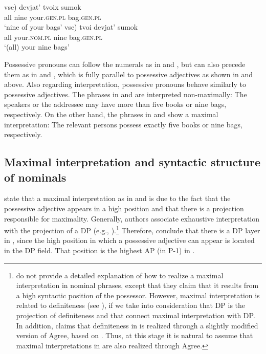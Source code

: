 \documentclass[output=paper,
colorlinks,
citecolor=brown,
newtxmath
]{langscibook}
\begin{document}
\ea\label{Num-Possprn2}
\ea\label{NumPossprn2}
\gll \minsp{(*} vse) devjat' tvoix sumok\\
{} all nine your.\textsc{gen.pl} bag.\textsc{gen.pl}\\
\glt `nine of your bags'
\ex\label{PossprnNum2}
\gll \minsp{(} vse) tvoi devjat' sumok\\
{} all your.\textsc{nom.pl} nine bag.\textsc{gen.pl}\\
\glt `(all) your nine bags'
\z\z

    \largerpage[-1] %

\noindent Possessive pronouns can follow the numerals as in  and , but can also precede them as in  and , which is fully parallel to possessive adjectives as shown in  and  above. Also regarding interpretation, possessive pronouns behave similarly to possessive adjectives. The phrases in  and  are interpreted non-maximally: The speakers or the addressee may have more than five books or nine bags, respectively. On the other hand, the phrases in  and  show a maximal interpretation: The relevant persons possess exactly five books or nine bags, respectively.

\subsection{Maximal interpretation and syntactic structure of nominals}\label{MS}

\citet{Kagan.Pereltsvaig2012} state that a maximal interpretation as in  and  is due to the fact that the possessive adjective appears in a high position and that there is a projection responsible for maximality. Generally, authors associate exhaustive interpretation with the projection of a DP (e.g., \citealp{Zamparelli2000}).\footnote{\citet{Kagan.Pereltsvaig2012} do not provide a detailed explanation of how to realize a maximal interpretation in nominal phrases, except that they claim that it results from a high syntactic position of the possessor. However, maximal interpretation is related to definiteness (see ), if we take into consideration that DP is the projection of definiteness \citep[see][]{Lyons1999} and that \citeauthor{Kagan.Pereltsvaig2012} connect maximal interpretation with DP. In addition, \citet{Koev2011} claims that definiteness in  is realized through a slightly modified version of Agree, based on \citet{Baker2008}. Thus, at this stage it is natural to assume that maximal interpretations in  are also realized through Agree.} Therefore, \citeauthor{Kagan.Pereltsvaig2012} conclude that there is a DP layer in , since the high position in which a possessive adjective can appear is located in the DP field. That position is the highest AP (in \textalpha P-1) in .
\end{document}
